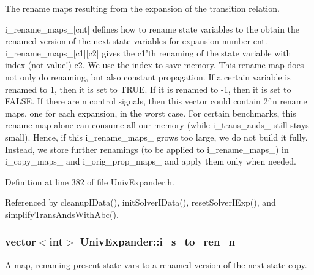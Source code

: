 The rename maps resulting from the expansion of the transition relation. 

i\-\_\-rename\-\_\-maps\-\_\-\mbox{[}cnt\mbox{]} defines how to rename state variables to the obtain the renamed version of the next-\/state variables for expansion number cnt. i\-\_\-rename\-\_\-maps\-\_\-\mbox{[}c1\mbox{]}\mbox{[}c2\mbox{]} gives the c1'th renaming of the state variable with index (not value!) c2. We use the index to save memory. This rename map does not only do renaming, but also constant propagation. If a certain variable is renamed to 1, then it is set to T\-R\-U\-E. If it is renamed to -\/1, then it is set to F\-A\-L\-S\-E. If there are n control signals, then this vector could contain 2$^\wedge$n rename maps, one for each expansion, in the worst case. For certain benchmarks, this rename map alone can consume all our memory (while i\-\_\-trans\-\_\-ands\-\_\- still stays small). Hence, if this i\-\_\-rename\-\_\-maps\-\_\- grows too large, we do not build it fully. Instead, we store further renamings (to be applied to i\-\_\-rename\-\_\-maps\-\_\-) in i\-\_\-copy\-\_\-maps\-\_\- and i\-\_\-orig\-\_\-prop\-\_\-maps\-\_\- and apply them only when needed. 

Definition at line 382 of file Univ\-Expander.\-h.



Referenced by cleanup\-I\-Data(), init\-Solver\-I\-Data(), reset\-Solver\-I\-Exp(), and simplify\-Trans\-Ands\-With\-Abc().

\hypertarget{classUnivExpander_a150474e2dd386599d750453eec601ec2}{
\subsubsection[{i\-\_\-s\-\_\-to\-\_\-ren\-\_\-n\-\_\-}]{\setlength{\rightskip}{0pt plus 5cm}vector$<$int$>$ Univ\-Expander\-::i\-\_\-s\-\_\-to\-\_\-ren\-\_\-n\-\_\-\hspace{0.3cm}{\ttfamily [protected]}}}\label{classUnivExpander_a150474e2dd386599d750453eec601ec2}


A map, renaming present-\/state vars to a renamed version of the next-\/state copy. 

